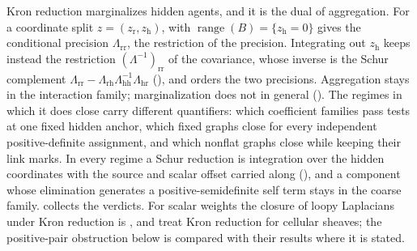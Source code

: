 Kron reduction marginalizes hidden agents, and it is the dual of aggregation.
For a coordinate split \(z=(z_{\mathrm r},z_{\mathrm h})\),
 with
\(\operatorname{range}(B)=\{z_{\mathrm h}=0\}\) gives the conditional precision
\(\Lambda_{\mathrm{rr}}\), the restriction of the precision. Integrating out
\(z_{\mathrm h}\) keeps instead the restriction
\((\Lambda^{-1})_{\mathrm{rr}}\) of the covariance, whose inverse is the Schur
complement
\(\Lambda_{\mathrm{rr}}-\Lambda_{\mathrm{rh}}\Lambda_{\mathrm{hh}}^{-1}\Lambda_{\mathrm{hr}}\)
(), and 
orders the two precisions. Aggregation stays in the interaction family;
marginalization does not in general (). The
regimes in which it does close carry different quantifiers: which coefficient
families pass tests at one fixed hidden anchor, which fixed graphs close for
every independent positive-definite assignment, and which nonflat graphs close
while keeping their link marks. In every regime a Schur reduction is
integration over the hidden coordinates with the source and scalar offset
carried along (), and a component whose
elimination generates a positive-semidefinite self term stays in the coarse
family.  collects the verdicts. For scalar weights
the closure of loopy Laplacians under Kron reduction is
\citet[Lemma~II.1]{DorflerBullo2013Kron}, and
\citet[Sec.~4.2, Thm.~4.3]{HansenGhrist2019} treat Kron reduction for cellular
sheaves; the positive-pair obstruction below is compared with their results
where it is stated.

